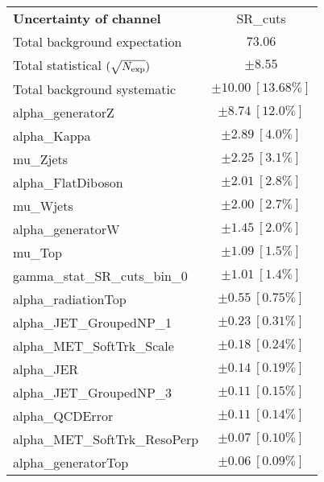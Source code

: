 
\begin{table}
\begin{center}
\setlength{\tabcolsep}{0.0pc}
\begin{tabular*}{\textwidth}{@{\extracolsep{\fill}}lc}
\noalign{\smallskip}\hline\noalign{\smallskip}
{\bf Uncertainty of channel}                                    & SR\_cuts            \\
\noalign{\smallskip}\hline\noalign{\smallskip}
Total background expectation             &  $73.06$       \\
\noalign{\smallskip}\hline\noalign{\smallskip}
Total statistical $(\sqrt{N_{\rm exp}})$              & $\pm 8.55$       \\
Total background systematic               & $\pm 10.00\ [13.68\%] $             \\
\noalign{\smallskip}\hline\noalign{\smallskip}
\noalign{\smallskip}\hline\noalign{\smallskip}
alpha\_generatorZ         & $\pm 8.74\ [12.0\%] $       \\
alpha\_Kappa         & $\pm 2.89\ [4.0\%] $       \\
mu\_Zjets         & $\pm 2.25\ [3.1\%] $       \\
alpha\_FlatDiboson         & $\pm 2.01\ [2.8\%] $       \\
mu\_Wjets         & $\pm 2.00\ [2.7\%] $       \\
alpha\_generatorW         & $\pm 1.45\ [2.0\%] $       \\
mu\_Top         & $\pm 1.09\ [1.5\%] $       \\
gamma\_stat\_SR\_cuts\_bin\_0         & $\pm 1.01\ [1.4\%] $       \\
alpha\_radiationTop         & $\pm 0.55\ [0.75\%] $       \\
alpha\_JET\_GroupedNP\_1         & $\pm 0.23\ [0.31\%] $       \\
alpha\_MET\_SoftTrk\_Scale         & $\pm 0.18\ [0.24\%] $       \\
alpha\_JER         & $\pm 0.14\ [0.19\%] $       \\
alpha\_JET\_GroupedNP\_3         & $\pm 0.11\ [0.15\%] $       \\
alpha\_QCDError         & $\pm 0.11\ [0.14\%] $       \\
alpha\_MET\_SoftTrk\_ResoPerp         & $\pm 0.07\ [0.10\%] $       \\
alpha\_generatorTop         & $\pm 0.06\ [0.09\%] $       \\

\end{tabular*}
\end{center}
\end{table}
